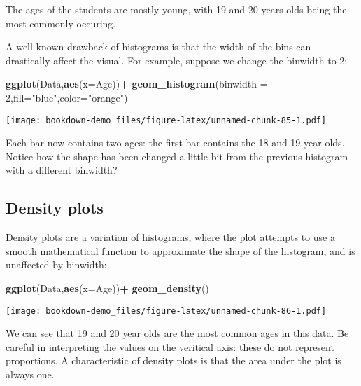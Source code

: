 \documentclass[
]{book}
\newenvironment{Shaded}{\begin{snugshade}}{\end{snugshade}}
\newcommand{\AttributeTok}[1]{\textcolor[rgb]{0.13,0.29,0.53}{#1}}
\newcommand{\DecValTok}[1]{\textcolor[rgb]{0.00,0.00,0.81}{#1}}
\newcommand{\FunctionTok}[1]{\textcolor[rgb]{0.13,0.29,0.53}{\textbf{#1}}}
\newcommand{\NormalTok}[1]{#1}
\newcommand{\SpecialCharTok}[1]{\textcolor[rgb]{0.81,0.36,0.00}{\textbf{#1}}}
\newcommand{\StringTok}[1]{\textcolor[rgb]{0.31,0.60,0.02}{#1}}
\begin{document}
The ages of the students are mostly young, with 19 and 20 years olds being the most commonly occuring.

A well-known drawback of histograms is that the width of the bins can drastically affect the visual. For example, suppose we change the binwidth to 2:

\begin{Shaded}
\begin{Highlighting}[]
\FunctionTok{ggplot}\NormalTok{(Data,}\FunctionTok{aes}\NormalTok{(}\AttributeTok{x=}\NormalTok{Age))}\SpecialCharTok{+}
  \FunctionTok{geom\_histogram}\NormalTok{(}\AttributeTok{binwidth =} \DecValTok{2}\NormalTok{,}\AttributeTok{fill=}\StringTok{"blue"}\NormalTok{,}\AttributeTok{color=}\StringTok{"orange"}\NormalTok{)}
\end{Highlighting}
\end{Shaded}

\texttt{[image: bookdown-demo\_files/figure-latex/unnamed-chunk-85-1.pdf]}

Each bar now contains two ages: the first bar contains the 18 and 19 year olds. Notice how the shape has been changed a little bit from the previous histogram with a different binwidth?

\hypertarget{density-plots}{%
\subsection{Density plots}\label{density-plots}}

Density plots are a variation of histograms, where the plot attempts to use a smooth mathematical function to approximate the shape of the histogram, and is unaffected by binwidth:

\begin{Shaded}
\begin{Highlighting}[]
\FunctionTok{ggplot}\NormalTok{(Data,}\FunctionTok{aes}\NormalTok{(}\AttributeTok{x=}\NormalTok{Age))}\SpecialCharTok{+}
  \FunctionTok{geom\_density}\NormalTok{()}
\end{Highlighting}
\end{Shaded}

\texttt{[image: bookdown-demo\_files/figure-latex/unnamed-chunk-86-1.pdf]}

We can see that 19 and 20 year olds are the most common ages in this data. Be careful in interpreting the values on the veritical axis: these do not represent proportions. A characteristic of density plots is that the area under the plot is always one.
\end{document}
